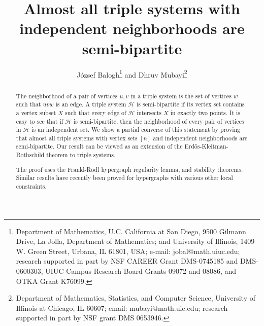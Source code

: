 \documentclass[11pt]{article}
\newcommand{\C}[1]{{\protect\cal #1}}
\begin{document}
\newtheorem{theorem}{Theorem}
\newtheorem{corollary}[theorem]{Corollary}
\newtheorem{lemma}[theorem]{Lemma}
\newtheorem{claim}[theorem]{Claim}
\newtheorem{proposition}[theorem]{Proposition}
\newtheorem{conjecture}[theorem]{Conjecture}
\newcommand\eps{\varepsilon}

\newcommand{\brac}[1]{\left(#1\right)}
\newcommand{\bfrac}[2]{\brac{\frac{#1}{#2}}}
\newcommand{\rdown}[1]{\left\lfloor#1\right\rfloor}
\newcommand{\rdup}[1]{\left\lceil#1\right\rceil}
\newcommand{\me}{\mathrm{e}}
\newcommand{\ee}{\epsilon}
\newcommand{\ex}{\mathrm{ex}}
\newcommand{\Bin}{\mathrm{Bin}}
\newcommand{\cG}{{{\cal G}}}
\newcommand{\cK}{{\cal K}}
\newcommand{\cH}{{\cal H}}
\newcommand{\cP}{{\cal P}}
\newcommand{\cJ}{{\cal J}}
\newcommand{\cE}{{\cal E}}
\newcommand{\cB}{{\cal B}}
\newcommand{\cM}{{\cal M}}
\def\Q{\mathcal{Q}}
\def\C{\mathcal{C}}
\newtheorem{definition}[theorem]{Definition}
\def\FF{\mathcal{F}}
\def\NN{\mathcal{N}}
\def\F{\mathcal{F}}
\def\S{\mathcal{S}}
\def\SS{\mathcal{S}}
\def\eps{\varepsilon}
\newcommand{\eee}{{\mathbb E}}
\def\HH{\mathcal{H}}
\parindent=0pt

\title{Almost all triple systems with independent neighborhoods
are semi-bipartite}


\author{J\'ozsef Balogh\thanks{{Department of
Mathematics, U.C. California at San Diego, 9500 Gilmann Drive, La
Jolla, Department of Mathematics; and  University of Illinois, 1409
W. Green Street, Urbana, IL 61801, USA}; e-mail:
{jobal@math.uiuc.edu;} research  supported in part   by NSF CAREER
Grant DMS-0745185 and DMS-0600303, UIUC Campus Research Board Grants
09072 and 08086, and OTKA Grant K76099.}  \quad  and \quad Dhruv
Mubayi\thanks{Department of Mathematics, Statistics, and Computer
Science, University of Illinois at Chicago, IL 60607;  email:
mubayi@math.uic.edu; research  supported in part by  NSF grant DMS
0653946.}}

\maketitle

\vspace{-0.4in}

\begin{abstract}
The neighborhood of a pair of vertices $u,v$ in a triple system is the set of vertices $w$ such that $uvw$ is an edge.
 A triple system
 $\HH$ is semi-bipartite if its vertex set
contains a vertex subset $X$ such that every edge of $\HH$
intersects $X$ in exactly two points. It is easy to see that if
$\HH$ is semi-bipartite, then the neighborhood of every pair of
vertices in $\HH$  is an independent set. We show a partial converse
of this statement by proving that almost all triple systems with
 vertex sets $[n]$ and independent neighborhoods are semi-bipartite. Our result can be
viewed as an extension
 of the Erd\H os-Kleitman-Rothschild theorem to triple systems.


The proof uses the Frankl-R\"odl hypergraph regularity lemma, and stability
theorems. Similar results have recently been proved for hypergraphs with various other local constraints.
\end{abstract}
\end{document}

